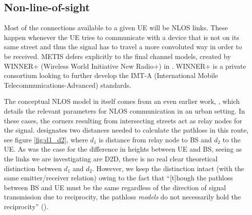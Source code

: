 \subsection{Non-line-of-sight} \label{NLOS}
Most of the connections available to a given UE will be NLOS links. These happen whenever the UE tries to communicate with a device that is not on its same street and thus the signal has to travel a more convoluted way in order to be received. METIS defers explicitly to the final channel models, created by WINNER+ (Wireless World Initiative New Radio+) in \cite{Heino2010}. WINNER+ is a private consortium looking to further develop the IMT-A (International Mobile Telecommunications-Advanced) standards. 

The conceptual NLOS model in itself comes from an even earlier work, \cite{Meinila2009}, which details the relevant parameters for NLOS communication in an urban setting. In these cases, the corners resulting from intersecting streets act as relay nodes for the signal. \cite{Meinila2009} designates two distances needed to calculate the pathloss in this route, see figure \ref{fig:d1_d2}, where $d_1$ is distance from relay node to BS and $d_2$ to the UE. As was the case for the difference in heights between UE and BS, seeing as the links we are investigating are D2D, there is no real clear theoretical distinction between $d_1$ and $d_2$. However, we keep the distinction intact (with the same emitter/receiver relation) owing to the fact that ``[t]hough the pathloss between BS and UE must be the same regardless of the direction of signal transmission due to reciprocity, the pathloss \textit{models} do not necessarily hold the reciprocity'' (\cite{Raschkowski}).

